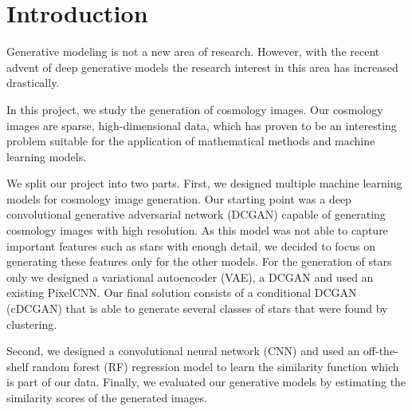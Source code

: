 \documentclass[10pt,conference,compsocconf]{IEEEtran}
\newcommand\TODO[1]{\textcolor{red}{#1}} %
\begin{document}
\section{Introduction}
\label{sec:introduction}
Generative modeling is not a new area of research. However, with the recent advent of deep generative models the research interest in this area has increased drastically. 

In this project, we study the generation of cosmology images. Our cosmology images are sparse, high-dimensional data, which has proven to be an interesting problem suitable for the application of mathematical methods and machine learning models.

We split our project into two parts. First, we designed multiple machine learning models for cosmology image generation. Our starting point was a deep convolutional generative adversarial network (DCGAN) capable of generating cosmology images with high resolution. As this model was not able to capture important features such as stars with enough detail, we decided to focus on generating these features only for the other models. 
For the generation of stars only we designed a variational autoencoder (VAE), a DCGAN and used an existing PixelCNN. 
Our final solution consists of a conditional DCGAN (cDCGAN) that is able to generate several classes of stars that were found by clustering.

Second, we designed a convolutional neural network (CNN) and used an off-the-shelf random forest (RF) regression model to learn the similarity function which is part of our data. Finally, we evaluated our generative models by estimating the similarity scores of the generated images. 



\end{document}
